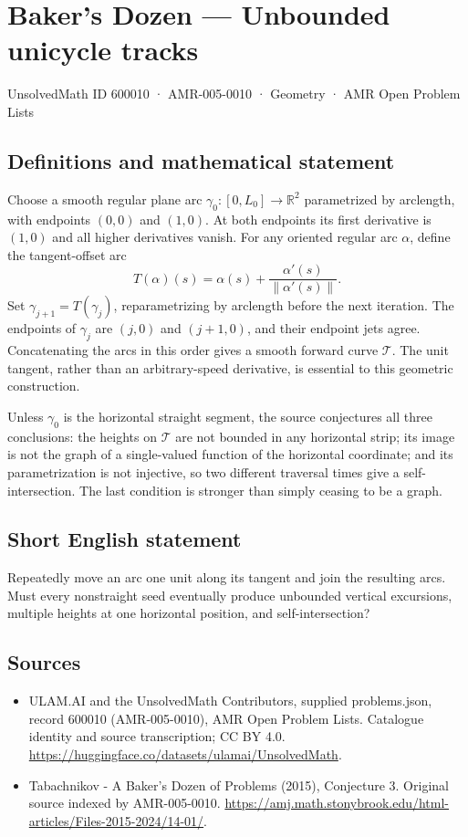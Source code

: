 \documentclass[11pt,a4paper]{article}
\begin{document}
\section*{Baker's Dozen — Unbounded unicycle tracks}\label{600010}
{\small UnsolvedMath ID 600010 · AMR-005-0010 · Geometry · AMR Open Problem Lists}
\subsection{Definitions and mathematical statement}
Choose a smooth regular plane arc $\gamma_0:[0,L_0]\to\mathbb R^2$ parametrized
by arclength, with endpoints $(0,0)$ and $(1,0)$. At both endpoints its first
derivative is $(1,0)$ and all higher derivatives vanish. For any oriented
regular arc $\alpha$, define the tangent-offset arc
\[
 T(\alpha)(s)=\alpha(s)+\frac{\alpha'(s)}{\|\alpha'(s)\|}.
\]
Set $\gamma_{j+1}=T(\gamma_j)$, reparametrizing by arclength before the next
iteration. The endpoints of $\gamma_j$ are $(j,0)$ and $(j+1,0)$, and their
endpoint jets agree. Concatenating the arcs in this order gives a smooth
forward curve $\mathcal T$. The unit tangent, rather than an arbitrary-speed
derivative, is essential to this geometric construction.

Unless $\gamma_0$ is the horizontal straight segment, the source conjectures
all three conclusions: the heights on $\mathcal T$ are not bounded in any
horizontal strip; its image is not the graph of a single-valued function of
the horizontal coordinate; and its parametrization is not injective, so two
different traversal times give a self-intersection. The last condition is
stronger than simply ceasing to be a graph.
\subsection{Short English statement}
Repeatedly move an arc one unit along its tangent and join the resulting
arcs. Must every nonstraight seed eventually produce unbounded vertical
excursions, multiple heights at one horizontal position, and self-intersection?
\subsection{Sources}
\begin{itemize}
\item[S1] ULAM.AI and the UnsolvedMath Contributors, supplied problems.json, record 600010 (AMR-005-0010), AMR Open Problem Lists. Catalogue identity and source transcription; CC BY 4.0.
\url{https://huggingface.co/datasets/ulamai/UnsolvedMath}.
\item[S2] Tabachnikov - A Baker's Dozen of Problems (2015), Conjecture 3. Original source indexed by AMR-005-0010.
\url{https://amj.math.stonybrook.edu/html-articles/Files-2015-2024/14-01/}.
\end{itemize}
\end{document}
